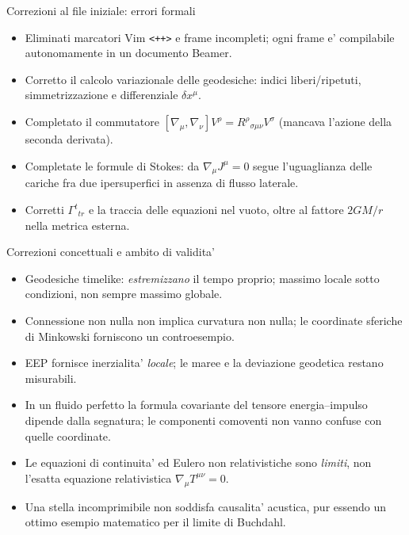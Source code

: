 \begin{frame}[t]{Correzioni al file iniziale: errori formali}\small\raggedright

\begin{itemize}
\item Eliminati marcatori Vim \texttt{<++>} e frame incompleti; ogni frame e' compilabile autonomamente in un documento Beamer.
\item Corretto il calcolo variazionale delle geodesiche: indici liberi/ripetuti, simmetrizzazione e differenziale $\delta x^\mu$.
\item Completato il commutatore $[\nabla_\mu,\nabla_\nu]V^\rho=R^\rho{}_{\sigma\mu\nu}V^\sigma$ (mancava l'azione della seconda derivata).
\item Completate le formule di Stokes: da $\nabla_\mu J^\mu=0$ segue l'uguaglianza delle cariche fra due ipersuperfici in assenza di flusso laterale.
\item Corretti $\Gamma^t{}_{tr}$ e la traccia delle equazioni nel vuoto, oltre al fattore $2GM/r$ nella metrica esterna.
\end{itemize}

\end{frame}

\begin{frame}[t]{Correzioni concettuali e ambito di validita'}\small\raggedright

\begin{itemize}
\item Geodesiche timelike: \emph{estremizzano} il tempo proprio; massimo locale sotto condizioni, non sempre massimo globale.
\item Connessione non nulla non implica curvatura non nulla; le coordinate sferiche di Minkowski forniscono un controesempio.
\item EEP fornisce inerzialita' \emph{locale}; le maree e la deviazione geodetica restano misurabili.
\item In un fluido perfetto la formula covariante del tensore energia--impulso dipende dalla segnatura; le componenti comoventi non vanno confuse con quelle coordinate.
\item Le equazioni di continuita' ed Eulero non relativistiche sono \emph{limiti}, non l'esatta equazione relativistica $\nabla_\mu T^{\mu\nu}=0$.
\item Una stella incomprimibile non soddisfa causalita' acustica, pur essendo un ottimo esempio matematico per il limite di Buchdahl.
\end{itemize}

\end{frame}

